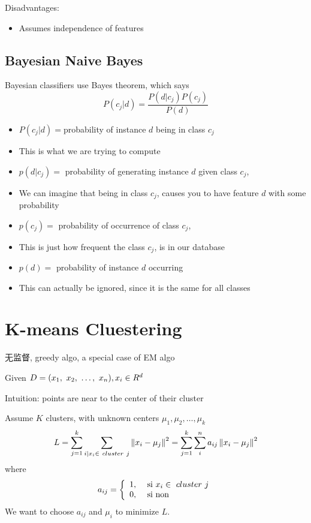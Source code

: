 \documentclass{article}
\begin{document}
Disadvantages:
\begin{itemize}
\item Assumes independence of features
\end{itemize}

\subsection{Bayesian Naive Bayes}
Bayesian classifiers use Bayes theorem, which says
$$P(c_j|d) = \dfrac{P(d|c_j) P(c_j)}{P(d)}$$

\begin{itemize}
\item $P(c_j|d) = $probability of instance $d$ being in class $c_j$
\item [] This is what we are trying to compute
\item $p(d | c_j) =$ probability of generating instance $d$ given class $c_j$,
\item [] We can imagine that being in class $c_j$, causes you to have feature $d$ with some probability 
\item $p(c_j) =$ probability of occurrence of class $c_j$, 
\item [] This is just how frequent the class $c_j$, is in our database
\item $p(d) =$ probability of instance $d$ occurring
\item [] This can actually be ignored, since it is the same for all classes
\end{itemize}

\section{K-means Cluestering}
无监督, greedy algo, a special case of EM algo

Given $D = (x_1,~x_2,~\ldots,~x_n), x_i \in R^d$

Intuition: points are near to the center of their cluster

Assume $K$ clusters, with unknown centers $\mu_1, \mu_2, \ldots, \mu_k$
$$
L
= \sum_{j = 1}^k \sum_{i | x_i \in\ cluster\ j}\left\Vert x_i - \mu_j\right\Vert^2
= \sum_{j = 1}^k \sum_i^n a_{ij}\left\Vert x_i - \mu_j\right\Vert^2
$$
where
$$
a_{ij} =
\left\{
  \begin{array}{ll}
    1, & \textrm{\ si } x_i \in\ cluster\ j\\
    0, & \textrm{ si non}
  \end{array}
\right.
$$
We want to choose $a_{ij}$ and $\mu_i$ to minimize $L$.
\end{document}
